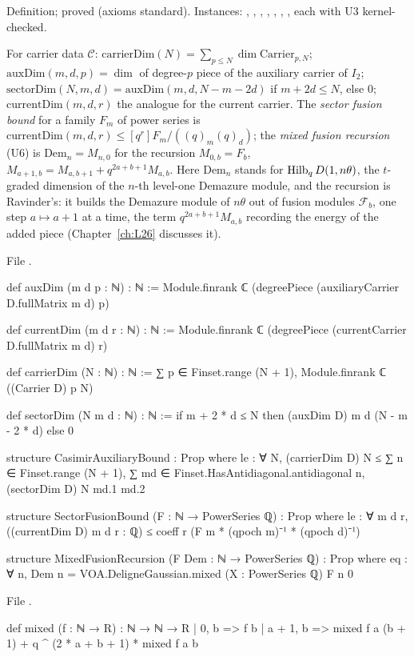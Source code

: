 \begin{status}
Definition;  proved (axioms standard). Instances: , , ,
, , , , each with U3 kernel-checked.
\end{status}

\begin{definition}\label{l24:def:chaininputs}
For carrier data $\mathscr C$: $\mathrm{carrierDim}(N)=\sum_{p\le N}\dim\mathrm{Carrier}_{p,N}$;
$\mathrm{auxDim}(m,d,p)=\dim$ of degree-$p$ piece of the auxiliary carrier of $I_2$; $\mathrm{sectorDim}(N,m,d)=\mathrm{auxDim}(m,d,N-m-2d)$ if
$m+2d\le N$, else $0$; $\mathrm{currentDim}(m,d,r)$ the analogue for the current carrier. The \emph{sector fusion
bound} for a family $F_m$ of power series is $\mathrm{currentDim}(m,d,r)\le[q^r]F_m/((q)_m(q)_d)$; the \emph{mixed
fusion recursion} (U6) is $\mathrm{Dem}_n=M_{n,0}$ for the recursion $M_{0,b}=F_b$,
$M_{a+1,b}=M_{a,b+1}+q^{2a+b+1}M_{a,b}$. Here $\mathrm{Dem}_n$ stands for $\operatorname{Hilb}_qD(1,n\theta)$, the
$t$-graded dimension of the $n$-th level-one Demazure module, and the recursion is Ravinder's: it builds the Demazure
module of $n\theta$ out of fusion modules $\mathcal F_b$, one step $a\mapsto a+1$ at a time, the term $q^{2a+b+1}M_{a,b}$
recording the energy of the added piece (Chapter~\ref{ch:L26} discusses it).
\end{definition}
\noindent File .
\begin{leancode}
def auxDim (m d p : ℕ) : ℕ :=
  Module.finrank ℂ (degreePiece (auxiliaryCarrier D.fullMatrix m d) p)

def currentDim (m d r : ℕ) : ℕ :=
  Module.finrank ℂ (degreePiece (currentCarrier D.fullMatrix m d) r)

def carrierDim (N : ℕ) : ℕ := ∑ p ∈ Finset.range (N + 1), Module.finrank ℂ ((Carrier D) p N)

def sectorDim (N m d : ℕ) : ℕ := if m + 2 * d ≤ N then (auxDim D) m d (N - m - 2 * d) else 0

structure CasimirAuxiliaryBound : Prop where
  le : ∀ N, (carrierDim D) N ≤
    ∑ n ∈ Finset.range (N + 1), ∑ md ∈ Finset.HasAntidiagonal.antidiagonal n, (sectorDim D) N md.1 md.2

structure SectorFusionBound (F : ℕ → PowerSeries ℚ) : Prop where
  le : ∀ m d r, ((currentDim D) m d r : ℚ) ≤ coeff r (F m * (qpoch m)⁻¹ * (qpoch d)⁻¹)

structure MixedFusionRecursion (F Dem : ℕ → PowerSeries ℚ) : Prop where
  eq : ∀ n, Dem n = VOA.DeligneGaussian.mixed (X : PowerSeries ℚ) F n 0
\end{leancode}
\noindent File .
\begin{leancode}
def mixed (f : ℕ → R) : ℕ → ℕ → R
  | 0, b => f b
  | a + 1, b => mixed f a (b + 1) + q ^ (2 * a + b + 1) * mixed f a b
\end{leancode}

